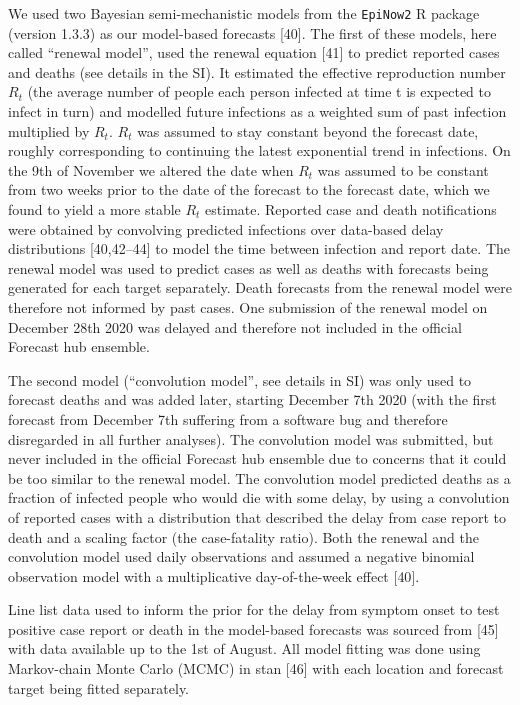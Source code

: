 \documentclass[10pt,letterpaper]{article}
\begin{document}
We used two Bayesian semi-mechanistic models from the \texttt{EpiNow2} R
package (version 1.3.3) as our model-based forecasts {[}40{]}. The first
of these models, here called ``renewal model'', used the renewal
equation {[}41{]} to predict reported cases and deaths (see details in
the SI). It estimated the effective reproduction number \(R_t\) (the
average number of people each person infected at time t is expected to
infect in turn) and modelled future infections as a weighted sum of past
infection multiplied by \(R_t\). \(R_t\) was assumed to stay constant
beyond the forecast date, roughly corresponding to continuing the latest
exponential trend in infections. On the 9th of November we altered the
date when \(R_t\) was assumed to be constant from two weeks prior to the
date of the forecast to the forecast date, which we found to yield a
more stable \(R_t\) estimate. Reported case and death notifications were
obtained by convolving predicted infections over data-based delay
distributions {[}40,42--44{]} to model the time between infection and
report date. The renewal model was used to predict cases as well as
deaths with forecasts being generated for each target separately. Death
forecasts from the renewal model were therefore not informed by past
cases. One submission of the renewal model on December 28th 2020 was
delayed and therefore not included in the official Forecast hub
ensemble.

The second model (``convolution model'', see details in SI) was only
used to forecast deaths and was added later, starting December 7th 2020
(with the first forecast from December 7th suffering from a software bug
and therefore disregarded in all further analyses). The convolution
model was submitted, but never included in the official Forecast hub
ensemble due to concerns that it could be too similar to the renewal
model. The convolution model predicted deaths as a fraction of infected
people who would die with some delay, by using a convolution of reported
cases with a distribution that described the delay from case report to
death and a scaling factor (the case-fatality ratio). Both the renewal
and the convolution model used daily observations and assumed a negative
binomial observation model with a multiplicative day-of-the-week effect
{[}40{]}.

Line list data used to inform the prior for the delay from symptom onset
to test positive case report or death in the model-based forecasts was
sourced from {[}45{]} with data available up to the 1st of August. All
model fitting was done using Markov-chain Monte Carlo (MCMC) in stan
{[}46{]} with each location and forecast target being fitted separately.
\end{document}
